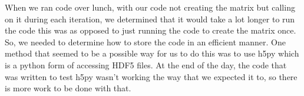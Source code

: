 
When we ran code over lunch, with our code not creating the matrix but calling on it during each iteration, we determined that it would take a lot longer to run the code this was as opposed to just running the code to create the matrix once. So, we needed to determine how to store the code in an efficient manner. One method that seemed to be a possible way for us to do this was to use h5py which is a python form of accessing HDF5 files. At the end of the day, the code that was written to test h5py wasn't working the way that we expected it to, so there is more work to be done with that. 